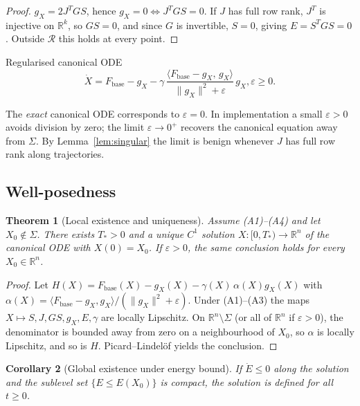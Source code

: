 \documentclass[11pt,oneside]{amsart}
\def\qquad{ }%
\theoremstyle{plain}
\newtheorem{theorem}{Theorem}[section]
\newtheorem{corollary}[theorem]{Corollary}
\theoremstyle{definition}
\newcommand{\Xdot}{\dot{X}}
\newcommand{\gX}{g_X}
\newcommand{\Fbase}{F_{\mathrm{base}}}
\newcommand{\R}{\mathbb{R}}
\begin{document}
\begin{proof}
$\gX = 2J^{T}GS$, hence $\gX = 0 \Leftrightarrow J^{T}GS = 0$. If $J$
has full row rank, $J^{T}$ is injective on $\R^{k}$, so $GS = 0$, and
since $G$ is invertible, $S = 0$, giving $E = S^{T}GS = 0$. Outside
$\mathcal{R}$ this holds at every point.
\end{proof}

\begin{defbox}{Regularised canonical ODE}
\[
  \Xdot
  = \Fbase - \gX
    - \gamma\,
      \frac{\langle \Fbase - \gX,\, \gX\rangle}{\|\gX\|^{2}+\varepsilon}\,
      \gX,
  \qquad \varepsilon \ge 0.
\]
\end{defbox}

The \emph{exact} canonical ODE corresponds to $\varepsilon = 0$. In
implementation a small $\varepsilon > 0$ avoids division by zero; the
limit $\varepsilon \to 0^{+}$ recovers the canonical equation away from
$\Sigma$. By Lemma~\ref{lem:singular} the limit is benign whenever
$J$ has full row rank along trajectories.

\subsection{Well-posedness}
\label{sec:wellposed}

\begin{theorem}[Local existence and uniqueness]
\label{thm:wellposed}
Assume (A1)--(A4) and let $X_{0}\notin\Sigma$. There exists
$T_{*}>0$ and a unique $C^{1}$ solution
$X:[0,T_{*})\to\R^{n}$ of the canonical ODE with $X(0)=X_{0}$.
If $\varepsilon > 0$, the same conclusion holds for every
$X_{0}\in\R^{n}$.
\end{theorem}

\begin{proof}
Let $H(X) = \Fbase(X) - \gX(X) - \gamma(X)\,\alpha(X)\gX(X)$ with
$\alpha(X) = \langle \Fbase-\gX,\gX\rangle / (\|\gX\|^{2}+\varepsilon)$.
Under (A1)--(A3) the maps $X\mapsto S, J, GS, \gX, E, \gamma$ are
locally Lipschitz. On $\R^{n}\setminus\Sigma$ (or all of $\R^{n}$ if
$\varepsilon>0$), the denominator is bounded away from zero on a
neighbourhood of $X_{0}$, so $\alpha$ is locally Lipschitz, and so is
$H$. Picard--Lindel\"of yields the conclusion.
\end{proof}

\begin{corollary}[Global existence under energy bound]
\label{cor:global}
If $\dot{E}\le 0$ along the solution and the sublevel set
$\{E\le E(X_{0})\}$ is compact, the solution is defined for all
$t\ge 0$.
\end{corollary}
\end{document}

